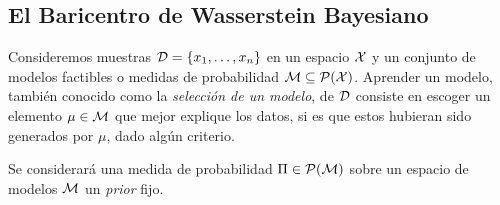 {{{	  }  %

	  \subsection{El Baricentro de Wasserstein Bayesiano}\label{ssec:baricentro-Wasserstein-Bayesiano}
	  {
		  Consideremos muestras $\Data = \left\{ x_1,\ldots, x_n  \right\}$ en un espacio $\cX$ y un conjunto de modelos factibles o medidas de probabilidad $\Models \subseteq \ProbSpace[\cX]$. Aprender un modelo, también conocido como la \emph{selección de un modelo}, de $\Data$ consiste en escoger un elemento $\mu \in \Models$ que mejor explique los datos, si es que estos hubieran sido generados por $\mu$, dado algún criterio.

		  Se considerará una medida de probabilidad $\Prior \in \ProbSpace[\Models]$ sobre un espacio de modelos $\Models$  un \emph{prior} fijo.
	  }  %

  }  %

 }